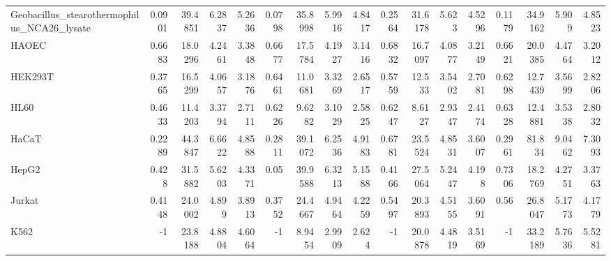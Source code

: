 \begin{tabular}{lrrrrrrrrrrrrrrrr}
 Geobacillus\_stearothermophilus\_NCA26\_lysate &              0.0901   &          39.4851 &           6.2837  &          5.2636  &         0.0798   &     35.8998 &       5.9916 &     4.8417  &       0.2564   &   31.6178 &    5.623   &   4.5296  &         0.1179   &     34.9162 &      5.909   &     4.8523  \\
 HAOEC                                       &              0.6683   &          18.0296 &           4.2461  &          3.3848  &         0.6677   &     17.5784 &       4.1927 &     3.1416  &       0.6832   &   16.7097 &    4.0877  &   3.2149  &         0.6621   &     20.0385 &      4.4764  &     3.2012  \\
 HEK293T                                     &              0.3765   &          16.5299 &           4.0657  &          3.1876  &         0.6461   &     11.0681 &       3.3269 &     2.6517  &       0.5759   &   12.533  &    3.5402  &   2.7081  &         0.6298   &     12.7439 &      3.5699  &     2.8206  \\
 HL60                                        &              0.4633   &          11.4203 &           3.3794  &          2.7111  &         0.6226   &      9.6282 &       3.1029 &     2.5825  &       0.6247   &    8.6127 &    2.9347  &   2.4174  &         0.6328   &     12.4881 &      3.5338  &     2.8032  \\
 HaCaT                                       &              0.2289   &          44.3847 &           6.6622  &          4.8588  &         0.2811   &     39.1072 &       6.2536 &     4.9183  &       0.6781   &   23.5524 &    4.8531  &   3.6007  &         0.2961   &     81.834  &      9.0462  &     7.3093  \\
 HepG2                                       &              0.428    &          31.5882 &           5.6203  &          4.3371  &         0.05     &     39.9588 &       6.3213 &     5.1588  &       0.4166   &   27.5064 &    5.2447  &   4.198   &         0.7306   &     18.2769 &      4.2751  &     3.3763  \\
 Jurkat                                      &              0.4148   &          24.0002 &           4.899   &          3.8913  &         0.3752   &     24.4667 &       4.9464 &     4.2259  &       0.5497   &   20.3893 &    4.5155  &   3.6091  &         0.56     &     26.8047 &      5.1773  &     4.1779  \\
 K562                                        &             -1        &          23.8188 &           4.8804  &          4.6064  &        -1        &      8.9454 &       2.9909 &     2.624   &      -1        &   20.0878 &    4.4819  &   3.5169  &        -1        &     33.2189 &      5.7636  &     5.5281  \\

\end{tabular}
